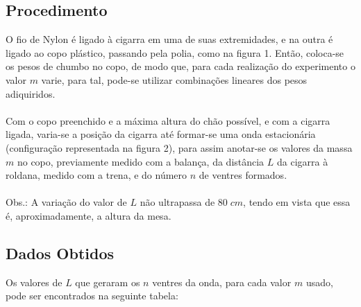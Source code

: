 \documentclass[12pt,a4paper]{article}
\begin{document}
\subsection{Procedimento}
O fio de Nylon é ligado à cigarra em uma de suas extremidades, e na outra é ligado ao copo plástico, passando pela polia, como na figura 1. Então, coloca-se os pesos de chumbo no copo, de modo que, para cada realização do experimento o valor $m$ varie, para tal, pode-se utilizar combinações lineares dos pesos adiquiridos. \\\\
Com o copo preenchido e a máxima altura do chão possível, e com a cigarra ligada, varia-se a posição da cigarra até formar-se uma onda estacionária (configuração representada na figura 2), para assim anotar-se os valores da massa $m$ no copo, previamente medido com a balança, da distância $L$ da cigarra à roldana, medido com a trena, e do número $n$ de ventres formados. \\\\
Obs.: A variação do valor de $L$ não ultrapassa de $80 \; cm$, tendo em vista que essa é, aproximadamente, a altura da mesa.


\subsection{Dados Obtidos}
Os valores de $L$ que geraram os $n$ ventres da onda, para cada valor $m$ usado, pode ser encontrados na seguinte tabela:\\
\end{document}

